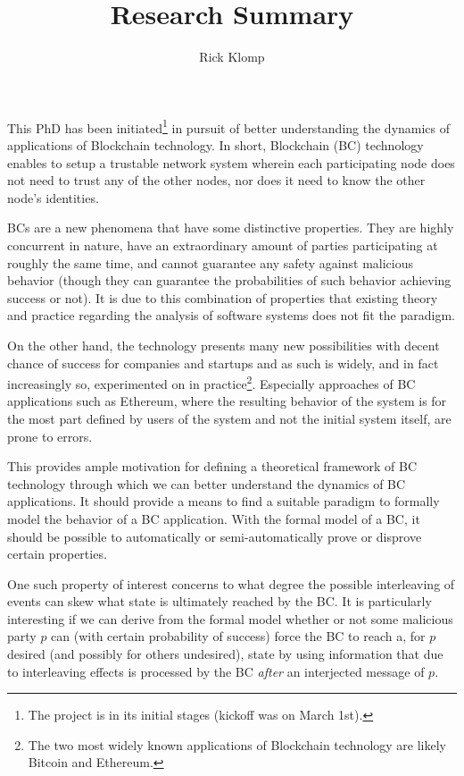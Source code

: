 \documentclass[]{article}
\title{Research Summary}
\author{Rick Klomp}
\begin{document}
\maketitle

This PhD has been initiated\footnote{The project is in its initial stages (kickoff was on March 1st).} in pursuit of better understanding the dynamics of applications of Blockchain technology. In short, Blockchain (BC) technology enables to setup a trustable network system wherein each participating node does not need to trust any of the other nodes, nor does it need to know the other node's identities.

BCs are a new phenomena that have some distinctive properties. They are highly concurrent in nature, have an extraordinary amount of parties participating at roughly the same time, and cannot guarantee any safety against malicious behavior (though they can guarantee the probabilities of such behavior achieving success or not). It is due to this combination of properties that existing theory and practice regarding the analysis of software systems does not fit the paradigm.

On the other hand, the technology presents many new possibilities with decent chance of success for companies and startups and as such is widely, and in fact increasingly so, experimented on in practice\footnote{
	The two most widely known applications of Blockchain technology are likely Bitcoin and Ethereum.
}. Especially approaches of BC applications such as Ethereum, where the resulting behavior of the system is for the most part defined by users of the system and not the initial system itself, are prone to errors.

This provides ample motivation for defining a theoretical framework of BC technology through which we can better understand the dynamics of BC applications. It should provide a means to find a suitable paradigm to formally model the behavior of a BC application. With the formal model of a BC, it should be possible to automatically or semi-automatically prove or disprove certain properties.

One such property of interest concerns to what degree the possible interleaving of events can skew what state is ultimately reached by the BC. It is particularly interesting if we can derive from the formal model whether or not some malicious party $p$ can (with certain probability of success) force the BC to reach a, for $p$ desired (and possibly for others undesired), state by using information that due to interleaving effects is processed by the BC \emph{after} an interjected message of $p$.
\end{document}
